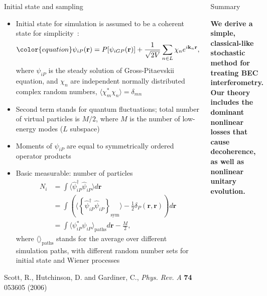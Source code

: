 \documentclass[final,hyperref={pdfpagelabels=false}]{beamer}
\begin{document}
\begin{frame}
\begin{columns}
{\begin{block}{Initial state and sampling}
\begin{itemize}
	\item Initial state for simulation is assumed to be a coherent state for simplicity~\cite{scott}:
\[\color{equation}
\psi_{iP}(\mathbf{r}) = P[\psi_{iGP}(\mathbf{r})] + \frac{1}{\sqrt{2V}} \sum\limits_{n \in L} \chi_n e^{i \mathbf{k}_n \mathbf{r}},
\]
		where $\psi_{iP}$ is the steady solution of Gross-Pitaevskii equation,
		and $\chi_n$ are independent normally distributed complex random numbers,
		$\langle \chi_m^* \chi_n \rangle = \delta_{mn}$
	\item Second term stands for quantum fluctuations; total number of virtual particles is $M/2$,
		where $M$ is the number of low-energy modes ($L$ subspace)
	\item Moments of $\psi_{iP}$  are equal to symmetrically ordered operator products
	\item Basic measurable: number of particles
\begin{align*}
N_i & = \int \langle \hat{\psi}_{iP}^\dagger \hat{\psi}_{iP} \rangle d\mathbf{r} \\
& = \int \left( \langle \left\{ \hat{\psi}_{iP}^\dagger \hat{\psi}_{iP} \right\}_{\textrm{sym}} \rangle -
	\frac{1}{2} \delta_P(\mathbf{r}, \mathbf{r})  \right) d\mathbf{r} \\
& = \int \langle \psi_{iP}^* \psi_{iP} \rangle_{\textrm{paths}} d\mathbf{r} - \frac{M}{2},
\end{align*}
	where $\langle \rangle_{\textrm{paths}}$ stands for the average over different simulation paths,
	with different random number sets for initial state and Wiener processes

\end{itemize}

\tiny{ \begin{thebibliography}{9}
	 Scott, R., Hutchinson, D. and Gardiner, C., \textit{Phys. Rev. A} \textbf{74} 053605 (2006)
\end{thebibliography} }
\end{block}

\begin{block}{Summary}

\large{\bf{\color{accent}We derive a simple, classical-like stochastic method for treating BEC interferometry.
Our theory includes the dominant nonlinear losses that cause decoherence, as well as nonlinear unitary evolution.}}

\end{block}

} %

\end{columns}
\end{frame}
\end{document}
